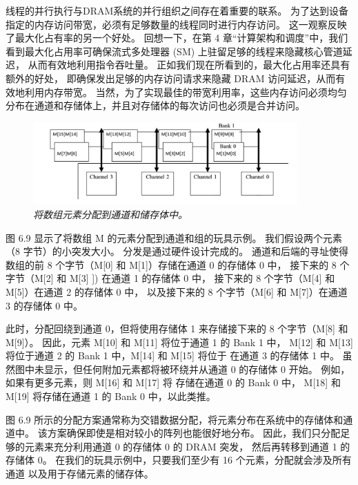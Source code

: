 线程的并行执行与DRAM系统的并行组织之间存在着重要的联系。 
为了达到设备指定的内存访问带宽，必须有足够数量的线程同时进行内存访问。 
这一观察反映了最大化占有率的另一个好处。 
回想一下，在第 4 章“计算架构和调度”中，我们看到最大化占用率可确保流式多处理器 (SM) 上驻留足够的线程来隐藏核心管道延迟，
从而有效地利用指令吞吐量。 正如我们现在所看到的，最大化占用率还具有额外的好处，
即确保发出足够的内存访问请求来隐藏 DRAM 访问延迟，从而有效地利用内存带宽。 
当然，为了实现最佳的带宽利用率，这些内存访问必须均匀分布在通道和存储体上，并且对存储体的每次访问也必须是合并访问。

\begin{figure}[H]
	\centering
	\includegraphics[width=0.9\textwidth]{figs/F6.9.png}
	\caption{\textit{将数组元素分配到通道和储存体中。}}
\end{figure}

图 6.9 显示了将数组 M 的元素分配到通道和组的玩具示例。 我们假设两个元素（8 字节）的小突发大小。 
分发是通过硬件设计完成的。 通道和后端的寻址使得数组的前 8 个字节（M[0] 和 M[1]）存储在通道 0 的存储体 0 中，
接下来的 8 个字节（M[2] 和 M[3] ]) 在通道 1 的存储体 0 中，
接下来的 8 个字节（M[4] 和 M[5]）在通道 2 的存储体 0 中，
以及接下来的 8 个字节（M[6] 和 M[7]）在通道 3 的存储体 0 中。

此时，分配回绕到通道 0，但将使用存储体 1 来存储接下来的 8 个字节（M[8] 和 M[9]）。 
因此，元素 M[10] 和 M[11] 将位于通道 1 的 Bank 1 中，
M[12] 和 M[13] 将位于通道 2 的 Bank 1 中，M[14] 和 M[15] 将位于 在通道 3 的存储体 1 中。
虽然图中未显示，但任何附加元素都将被环绕并从通道 0 的存储体 0 开始。
例如，如果有更多元素，则 M[16] 和 M[17] 将 存储在通道 0 的 Bank 0 中，
M[18] 和 M[19] 将存储在通道 1 的 Bank 0 中，以此类推。

图 6.9 所示的分配方案通常称为交错数据分配，将元素分布在系统中的存储体和通道中。 
该方案确保即使是相对较小的阵列也能很好地分布。 因此，我们只分配足够的元素来充分利用通道 0 的存储体 0 的 DRAM 突发，
然后再转移到通道 1 的存储体 0。
在我们的玩具示例中，只要我们至少有 16 个元素，分配就会涉及所有通道 以及用于存储元素的储存体。


